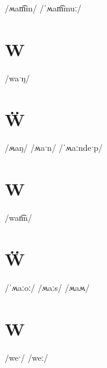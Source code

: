 \documentclass[10pt,a4paper,twoside]{book}
\begin{document}
\begin{multicols}{3}
 {/ʍam͡m/} {}
 {/ˈʍam͡muː/} {}
\end{multicols}

\section*{W}

\begin{multicols}{3}
 {/waˑŋ/} {}
\end{multicols}

\section*{Ẅ}

\begin{multicols}{3}
 {/ʍaŋ/} {}
 {/ʍaˑn/} {}
 {/ˈʍaːndeˑp/} {}
\end{multicols}

\section*{W}

\begin{multicols}{3}
 {/wan͡n/} {}
\end{multicols}

\section*{Ẅ}

\begin{multicols}{3}
 {/ˈʍaːoː/} {}
 {/ʍaːs/} {}
 {/ʍaʍ/} {}
\end{multicols}

\section*{W}

\begin{multicols}{3}
 {/weˑ/} {}
 {/weː/} {}
\end{multicols}
\end{document}

